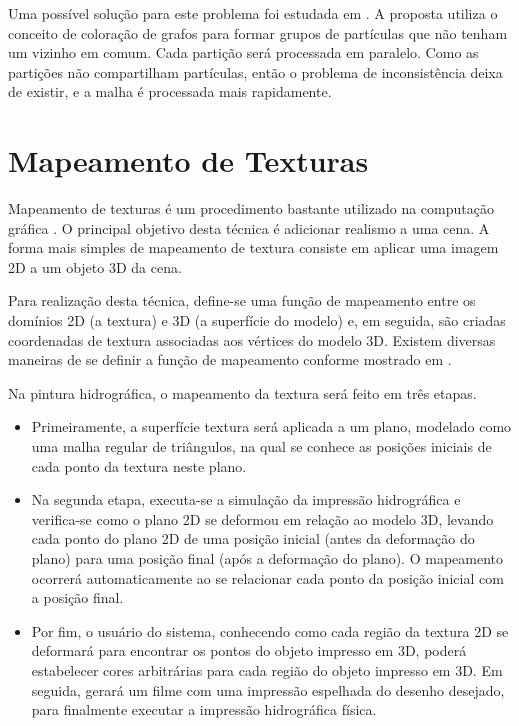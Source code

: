 Uma possível solução para este problema foi estudada em \cite{fratarcangeli2013gpu}. A proposta utiliza o conceito de coloração de grafos para formar grupos de partículas que não tenham um vizinho em comum. Cada partição será processada em paralelo. Como as partições não compartilham partículas, então o problema de inconsistência deixa de existir, e a malha é processada mais rapidamente.

\section{Mapeamento de Texturas}

Mapeamento de texturas é um procedimento bastante utilizado na computação gráfica \cite{haeberli1993texture}. O principal objetivo desta técnica é adicionar realismo a uma cena. A forma mais simples de mapeamento de textura consiste em aplicar uma imagem 2D a um objeto 3D da cena. \cite{shreiner2013opengl}

Para realização desta técnica, define-se uma função de mapeamento entre os domínios 2D (a textura) e 3D (a superfície do modelo) e, em seguida, são criadas coordenadas de textura associadas aos vértices do modelo 3D. Existem diversas maneiras de se definir a função de mapeamento conforme mostrado em \cite{hormann2007mesh}.

Na pintura hidrográfica, o mapeamento da textura será feito em três etapas. 
\begin{itemize}
\item Primeiramente, a superfície textura será aplicada a um plano, modelado como uma malha regular de triângulos, na qual se conhece as posições iniciais de cada ponto da textura neste plano. 
\item Na segunda etapa, executa-se a simulação da impressão hidrográfica e verifica-se como o plano 2D se deformou em relação ao modelo 3D, levando cada ponto do plano 2D de uma posição inicial (antes da deformação do plano) para uma posição final (após a deformação do plano). O mapeamento ocorrerá automaticamente ao se relacionar cada ponto da posição inicial com a posição final. 
\item Por fim, o usuário do sistema, conhecendo como cada região da textura 2D se deformará para encontrar os pontos do objeto impresso em 3D, poderá estabelecer cores arbitrárias para cada região do objeto impresso em 3D. Em seguida, gerará um filme com uma impressão espelhada do  desenho desejado, para finalmente executar a impressão hidrográfica física.
\end{itemize}